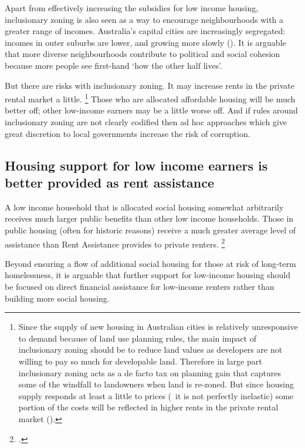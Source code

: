 Apart from effectively increasing the subsidies for low income housing, inclusionary zoning is also seen as a way to encourage neighbourhoods with a greater range of incomes. Australia's capital cities are increasingly segregated: incomes in outer suburbs are lower, and growing more slowly ().
It is arguable that more diverse neighbourhoods contribute to political and social cohesion because more people see first-hand `how the other half lives'. 

But there are risks with inclusionary zoning.  It may increase rents in the private rental market a little.%
	\footnote{Since the supply of new housing in Australian cities is relatively unresponsive to demand because of land use planning rules, the main impact of inclusionary zoning should be to reduce land values as developers are not willing to pay so much for developable land.
	Therefore in large part inclusionary zoning acts as a de facto tax on planning gain that captures some of the windfall to landowners when land is re-zoned.
	But since housing supply responds at least a little to prices (\ie~it is not perfectly inelastic) some portion of the costs will be reflected in higher rents in the private rental market (\textcite[][9]{Daley-etal-2017-Submission-Natl-housing-finance}).}
Those who are allocated affordable housing will be much better off; other low-income earners may be a little worse off. And if rules around inclusionary zoning are not clearly codified then ad hoc approaches which give great discretion to local governments increase the risk of corruption. 

\subsection{Housing support for low income earners is better provided as rent assistance}\label{subsec:Housing-support-for-low-income-earners}

A low income household that is allocated social housing somewhat arbitrarily receives much larger public benefits than other low income households.
Those in public housing (often for historic reasons) receive a much greater average level of assistance than Rent Assistance provides to private renters.%
    \footcite[][605]{HenryTaxReview2010-Part2-Detailed-analysis}

Beyond ensuring a flow of additional social housing for those at risk of long-term homelessness, it is arguable that further support for low-income housing should be focused on direct financial assistance for low-income renters rather than building more social housing.

